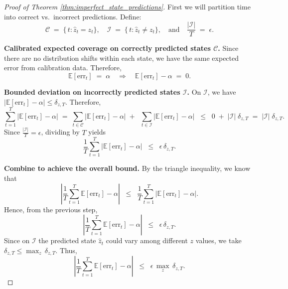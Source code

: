 \begin{proof}[Proof of Theorem \ref{thm:imperfect_state_predictions}]

First we will partition time into correct vs.\ incorrect predictions. Define:
\[
  \mathcal{C} 
  \;=\; \{\,t : \hat{z}_t = z_t\},
  \quad
  \mathcal{I} 
  \;=\; \{\,t : \hat{z}_t \neq z_t\},
  \quad
  \text{and}
  \quad
  \frac{|\mathcal{I}|}{T} \;=\;\epsilon.
\]

\smallskip

\textbf{Calibrated expected coverage on correctly predicted states \(\mathcal{C}\).}
Since there are no distribution shifts within each state, we have the same expected error from calibration data. Therefore,
\[
  \mathbb{E}[\mathrm{err}_t] 
  \;=\; \alpha
  \quad\Longrightarrow\quad
  \mathbb{E}[\mathrm{err}_t] - \alpha 
  \;=\; 0.
\]

\smallskip

\textbf{Bounded deviation on incorrectly predicted states \(\mathcal{I}\).}
On \(\mathcal{I}\), we have 
\(\bigl|\mathbb{E}[\mathrm{err}_t] - \alpha\bigr| \le \delta_{z,T}\).  
Therefore,
\[
  \sum_{t=1}^T 
    \bigl|\mathbb{E}[\mathrm{err}_t] - \alpha\bigr|
  \;=\;
  \sum_{t \in \mathcal{C}} \bigl|\mathbb{E}[\mathrm{err}_t] - \alpha\bigr|
  \;+\;\;
  \sum_{t \in \mathcal{I}} \bigl|\mathbb{E}[\mathrm{err}_t] - \alpha\bigr|
  \;\;\le\;\;
  0 \;+\; |\mathcal{I}|\;\delta_{z,T}
  \;=\; 
  |\mathcal{I}|\;\delta_{z,T}.
\]
Since \(\tfrac{|\mathcal{I}|}{T}=\epsilon\), dividing by \(T\) yields
\[
  \frac{1}{T} 
  \sum_{t=1}^T 
    \bigl|\mathbb{E}[\mathrm{err}_t] - \alpha\bigr|
  \;\;\le\;\;
  \epsilon\,\delta_{z,T}.
\]

\smallskip

\textbf{Combine to achieve the overall bound.}
By the triangle inequality, we know that
\[
  \left|
    \frac{1}{T}\sum_{t=1}^T \mathbb{E}[\mathrm{err}_t] - \alpha
  \right|
  \;\;\le\;\;
  \frac{1}{T}\sum_{t=1}^T 
    \bigl|\mathbb{E}[\mathrm{err}_t] - \alpha\bigr|.
\]
Hence, from the previous step,
\[
  \left|
    \frac{1}{T}\sum_{t=1}^T \mathbb{E}[\mathrm{err}_t] - \alpha
  \right|
  \;\;\le\;\;
  \epsilon\,\delta_{z,T}.
\]
Since on \(\mathcal{I}\) the predicted state \(\hat{z}_t\) could vary among different \(z\) values, we take
\(\delta_{z,T} \le \max_{z}\,\delta_{z,T}\). 
Thus,
\[
  \left|
    \frac{1}{T}\sum_{t=1}^T \mathbb{E}[\mathrm{err}_t] - \alpha
  \right|
  \;\;\le\;\;
  \epsilon\,\max_{z}\,\delta_{z,T}.
\]
\end{proof}

